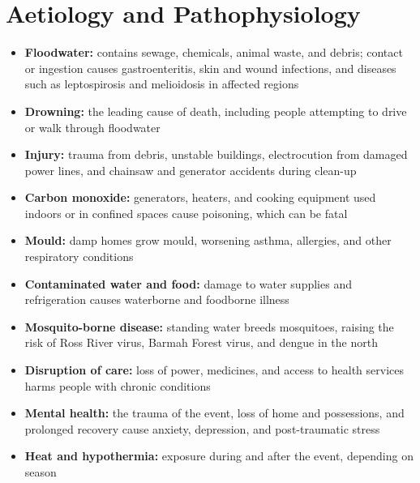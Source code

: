 \section*{Aetiology and Pathophysiology}
\begin{itemize}
    \item \textbf{Floodwater:} contains sewage, chemicals, animal waste, and debris; contact or ingestion causes gastroenteritis, skin and wound infections, and diseases such as leptospirosis and melioidosis in affected regions
    \item \textbf{Drowning:} the leading cause of death, including people attempting to drive or walk through floodwater
    \item \textbf{Injury:} trauma from debris, unstable buildings, electrocution from damaged power lines, and chainsaw and generator accidents during clean-up
    \item \textbf{Carbon monoxide:} generators, heaters, and cooking equipment used indoors or in confined spaces cause poisoning, which can be fatal
    \item \textbf{Mould:} damp homes grow mould, worsening asthma, allergies, and other respiratory conditions
    \item \textbf{Contaminated water and food:} damage to water supplies and refrigeration causes waterborne and foodborne illness
    \item \textbf{Mosquito-borne disease:} standing water breeds mosquitoes, raising the risk of Ross River virus, Barmah Forest virus, and dengue in the north
    \item \textbf{Disruption of care:} loss of power, medicines, and access to health services harms people with chronic conditions
    \item \textbf{Mental health:} the trauma of the event, loss of home and possessions, and prolonged recovery cause anxiety, depression, and post-traumatic stress
    \item \textbf{Heat and hypothermia:} exposure during and after the event, depending on season
\end{itemize}

